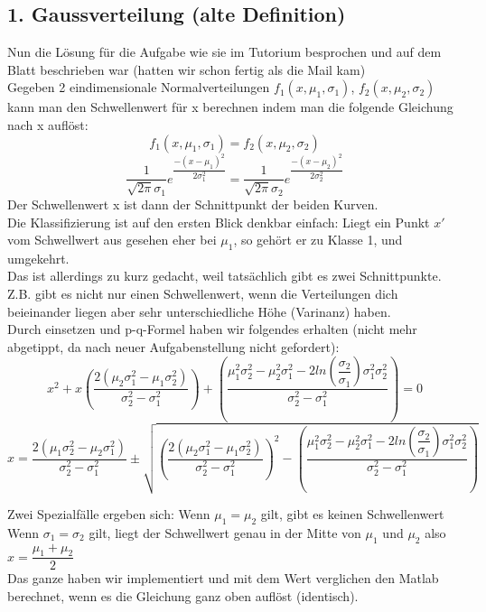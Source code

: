 \documentclass{article}
\begin{document}
\subsection*{1. Gaussverteilung (alte Definition)}
	Nun die Lösung für die Aufgabe wie sie im Tutorium besprochen und auf dem Blatt beschrieben war (hatten wir schon fertig als die Mail kam)\\
	Gegeben 2 eindimensionale Normalverteilungen $f_1(x,\mu_1, \sigma_1)$, $f_2(x,\mu_2, \sigma_2)$ kann man den Schwellenwert für x berechnen indem man die folgende Gleichung nach x auflöst:
	\[
		f_1(x,\mu_1, \sigma_1) = f_2(x,\mu_2, \sigma_2)
	\]
	\[
		\dfrac{1}{\sqrt{2\pi}\sigma_1} e^{\dfrac{-(x-\mu_1)^2}{2\sigma_1^2}} = \dfrac{1}{\sqrt{2\pi}\sigma_2} e^{\dfrac{-(x-\mu_2)^2}{2\sigma_2^2}}
	\]
	Der Schwellenwert x ist dann der Schnittpunkt der beiden Kurven.\\
	Die Klassifizierung ist auf den ersten Blick denkbar einfach: Liegt ein Punkt $x'$ vom Schwellwert aus gesehen eher bei $\mu_1$, so gehört er zu Klasse 1, und umgekehrt.\\
	Das ist allerdings zu kurz gedacht, weil tatsächlich gibt es zwei Schnittpunkte. Z.B. gibt es nicht nur einen Schwellenwert, wenn die Verteilungen dich beieinander liegen aber sehr unterschiedliche Höhe (Varinanz) haben.\\
	
	Durch einsetzen und p-q-Formel haben wir folgendes erhalten (nicht mehr abgetippt, da nach neuer Aufgabenstellung nicht gefordert):
	\[
		x^2
		+ x\left( \frac{2(\mu_2 \sigma_1^2 - \mu_1\sigma_2^2)}{\sigma_2^2 - \sigma_1^2} \right)
		+ \left( \dfrac{\mu_1^2\sigma_2^2 - \mu_2^2\sigma_1^2-2ln(\dfrac{\sigma_2}{\sigma_1}) \sigma_1^2 \sigma_2^2}{\sigma_2^2 - \sigma_1^2} \right)
		= 0
	\]
	\[
		x = \frac{2(\mu_1\sigma_2^2 - \mu_2 \sigma_1^2)}{\sigma_2^2 - \sigma_1^2}
		\pm \sqrt{ \left( \frac{2(\mu_2 \sigma_1^2 - \mu_1\sigma_2^2)}{\sigma_2^2 - \sigma_1^2} \right)^2 - \left( \dfrac{\mu_1^2\sigma_2^2 - \mu_2^2\sigma_1^2-2ln(\dfrac{\sigma_2}{\sigma_1}) \sigma_1^2 \sigma_2^2}{\sigma_2^2 - \sigma_1^2} \right) }
	\]
	
	Zwei Spezialfälle ergeben sich: Wenn $\mu_1 = \mu_2$ gilt, gibt es keinen Schwellenwert\\
	Wenn $\sigma_1 = \sigma_2$ gilt, liegt der Schwellwert genau in der Mitte von $\mu_1$ und $\mu_2$ also $x = \dfrac{\mu_1 + \mu_2}{2}$\\
	
	Das ganze haben wir implementiert und mit dem Wert verglichen den Matlab berechnet, wenn es die Gleichung ganz oben auflöst (identisch).
\end{document}
